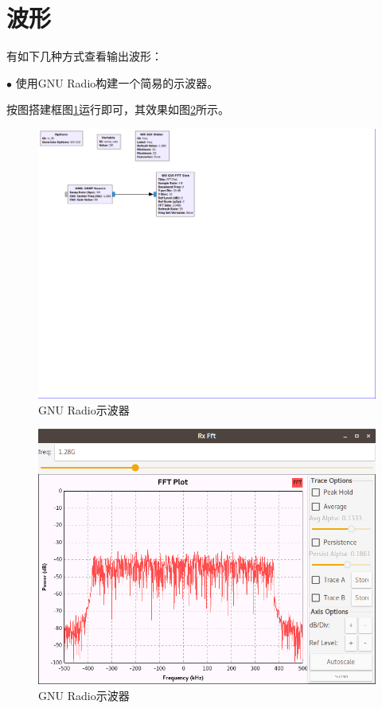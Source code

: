 	\section{波形}
		\par 有如下几种方式查看输出波形：
		\par $\bullet$ 使用GNU Radio构建一个简易的示波器。
		\par 按图搭建框图\ref{fig:dvbt_rx_fft}运行即可，其效果如图\ref{fig:dvbt_rx_fft_1}所示。
		\begin{figure}[htp]
			\centering
			\includegraphics[width=13cm]{figures/dvbt_rx_fft.png}
			\caption{GNU Radio示波器}
			\label{fig:dvbt_rx_fft}
		\end{figure}
		\begin{figure}[htp]
			\centering
			\includegraphics[width=13cm]{figures/dvbt_rx_fft_1.png}
			\caption{GNU Radio示波器}
			\label{fig:dvbt_rx_fft_1}
		\end{figure}
